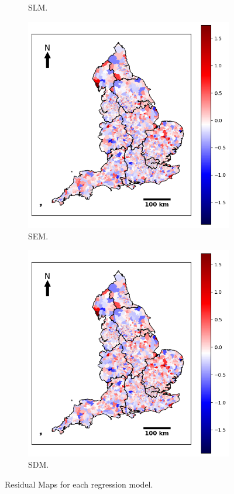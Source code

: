\begin{figure}[ht]
\begin{subfigure}{.4\textwidth}
  \caption{SLM.}
  \label{fig:A4.72}
\end{subfigure}
\begin{subfigure}{.4\textwidth}
  \centering
  \includegraphics[width=1\linewidth]{ucl-latex-thesis-templates-master/Image/resi_SEM_3.png}
  \caption{SEM.}
  \label{fig:A4.73}
\end{subfigure}
\begin{subfigure}{.4\textwidth}
  \centering
  \includegraphics[width=1\linewidth]{ucl-latex-thesis-templates-master/Image/resi_SDM_4.png}
  \caption{SDM.}
  \label{fig:A4.74}
\end{subfigure}
\caption{Residual Maps for each regression model.}
\label{fig:A4.7}
\end{figure}